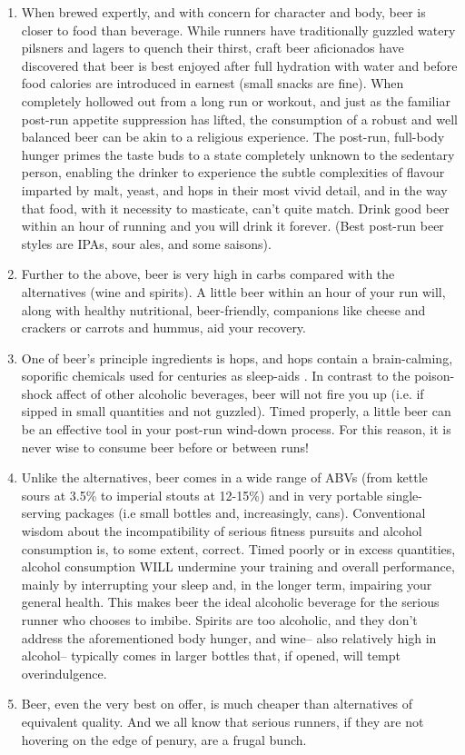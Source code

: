 \begin{enumerate}
    \item When brewed expertly, and with concern for character and body, beer is closer to food than beverage. While runners have traditionally guzzled watery pilsners and lagers to quench their thirst, craft beer aficionados have discovered that beer is best enjoyed after full hydration with water and before food calories are introduced in earnest (small snacks are fine). When completely hollowed out from a long run or workout, and just as the familiar post-run appetite suppression has lifted, the consumption of a robust and well balanced beer can be akin to a religious experience. The post-run, full-body hunger primes the taste buds to a state completely unknown to the sedentary person, enabling the drinker to experience the subtle complexities of flavour imparted by malt, yeast, and hops in their most vivid detail, and in the way that food, with it necessity to masticate, can't quite match. Drink good beer within an hour of running and you will drink it forever. (Best post-run beer styles are IPAs, sour ales, and some saisons).

    \item  Further to the above, beer is very high in carbs compared with the alternatives (wine and spirits). A little beer within an hour of your run will, along with healthy nutritional, beer-friendly, companions like cheese and crackers or carrots and hummus, aid your recovery.

    \item One of beer's principle ingredients is hops, and hops contain a brain-calming, soporific chemicals used for centuries as sleep-aids . In contrast to the poison-shock affect of other alcoholic beverages, beer will not fire you up (i.e. if sipped in small quantities and not guzzled). Timed properly, a little beer can be an effective tool in your post-run wind-down process. For this reason, it is never wise to consume beer before or between runs!

    \item Unlike the alternatives, beer comes in a wide range of ABVs (from kettle sours at 3.5\% to imperial stouts at 12-15\%) and in very portable single-serving packages (i.e small bottles and, increasingly, cans). Conventional wisdom about the incompatibility of serious fitness pursuits and alcohol consumption is, to some extent, correct. Timed poorly or in excess quantities, alcohol consumption WILL undermine your training and overall performance, mainly by interrupting your sleep and, in the longer term, impairing your general health. This makes beer the ideal alcoholic beverage for the serious runner who chooses to imbibe. Spirits are too alcoholic, and they don't address the aforementioned body hunger, and wine-- also relatively high in alcohol-- typically comes in larger bottles that, if opened, will tempt overindulgence.

    \item Beer, even the very best on offer, is much cheaper than alternatives of equivalent quality. And we all know that serious runners, if they are not hovering on the edge of penury, are a frugal bunch.
\end{enumerate}

